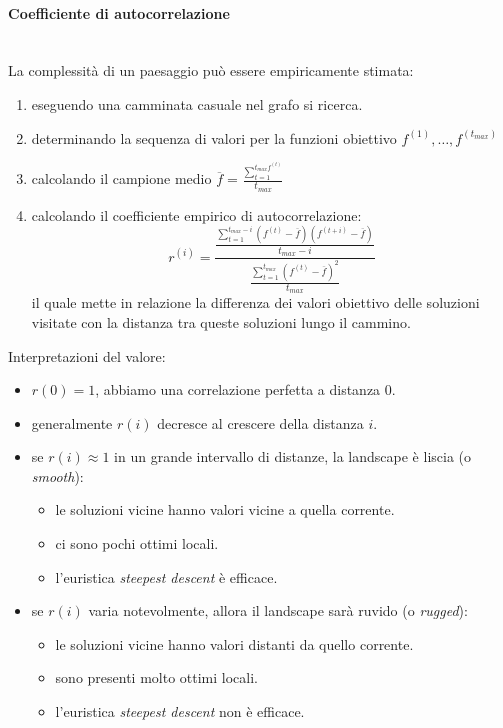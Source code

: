 \documentclass{article}
\begin{document}
\paragraph{Coefficiente di autocorrelazione}\mbox{}\\
La complessità di un paesaggio può essere empiricamente stimata:
\begin{enumerate}
    \item eseguendo una camminata casuale nel grafo si ricerca.
    \item determinando la sequenza di valori per la funzioni obiettivo $f^{(1)},\dots,f^{(t_{max})}$
    \item calcolando il campione medio $\overline{f}=\frac{\sum_{t=1}^{t_{max}f^{(t)}}}{t_{max}}$
    \item calcolando il coefficiente empirico di autocorrelazione:
          $$r^{(i)}=\frac{\frac{\sum_{t=1}^{t_{max}-i}\left(f^{(t)}-\overline{f}\right)\left(f^{(t+i)}-\overline{f}\right)}{t_{max}-i}}{\frac{\sum_{t=1}^{t_{max}}\left(f^{(t)}-\overline{f}\right)^2}{t_{max}}}$$
          il quale mette in relazione la differenza dei valori obiettivo delle soluzioni visitate con la distanza tra queste soluzioni lungo il cammino.
\end{enumerate}

Interpretazioni del valore:
\begin{itemize}
    \item $r(0)=1$, abbiamo una correlazione perfetta a distanza 0.
    \item generalmente $r(i)$ decresce al crescere della distanza $i$.
    \item se $r(i)\approx 1$ in un grande intervallo di distanze, la landscape è liscia (o \textit{smooth}):
          \begin{itemize}
              \item le soluzioni vicine hanno valori vicine a quella corrente.
              \item ci sono pochi ottimi locali.
              \item l'euristica \textit{steepest descent} è efficace.
          \end{itemize}
    \item se $r(i)$ varia notevolmente, allora il landscape sarà ruvido (o \textit{rugged}):
          \begin{itemize}
              \item le soluzioni vicine hanno valori distanti da quello corrente.
              \item sono presenti molto ottimi locali.
              \item l'euristica \textit{steepest descent} non è efficace.
          \end{itemize}
\end{itemize}
\end{document}
